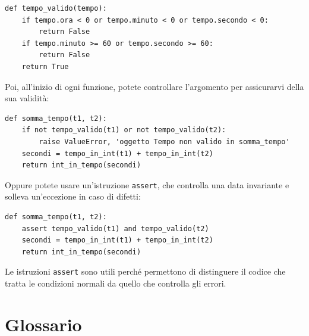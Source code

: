 \documentclass[10pt]{book}
\begin{document}
\begin{verbatim}
def tempo_valido(tempo):
    if tempo.ora < 0 or tempo.minuto < 0 or tempo.secondo < 0:
        return False
    if tempo.minuto >= 60 or tempo.secondo >= 60:
        return False
    return True
\end{verbatim}
%
Poi, all'inizio di ogni funzione, potete controllare l'argomento per assicurarvi della sua validità:

\begin{verbatim}
def somma_tempo(t1, t2):
    if not tempo_valido(t1) or not tempo_valido(t2):
        raise ValueError, 'oggetto Tempo non valido in somma_tempo'
    secondi = tempo_in_int(t1) + tempo_in_int(t2)
    return int_in_tempo(secondi)
\end{verbatim}
%
Oppure potete usare un'istruzione {\tt assert}, che controlla una data invariante e solleva un'eccezione in caso di difetti:

\begin{verbatim}
def somma_tempo(t1, t2):
    assert tempo_valido(t1) and tempo_valido(t2)
    secondi = tempo_in_int(t1) + tempo_in_int(t2)
    return int_in_tempo(secondi)
\end{verbatim}
%
Le istruzioni {\tt assert} sono utili perché permettono di distinguere il codice che tratta le condizioni normali da quello che controlla gli errori.


\section{Glossario}
\end{document}
